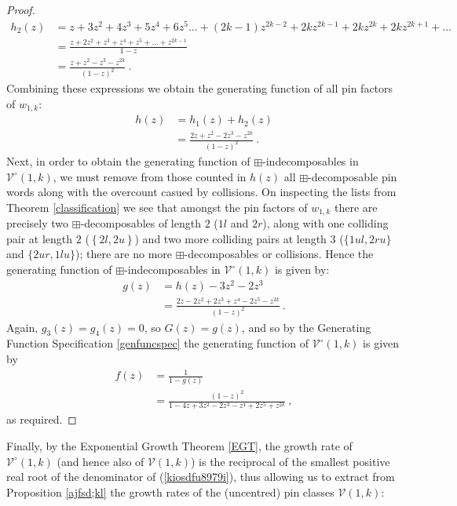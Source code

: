\documentclass[11pt,a4paper]{article}
\theoremstyle{definition}
\begin{document}
\begin{proof}
\[
\begin{split}
h_{2}(z) & = z + 3z^2 + 4z^3 + 5z^4 + 6z^5 \dots + (2k-1)z^{2k-2} + 2kz^{2k-1} + 2kz^{2k} + 2kz^{2k+1} + \dots\\
 & = \frac{z + 2z^2 + z^3 + z^4 + z^5 + \dots + z^{2k-1}}{1 - z} \\
 & = \frac{z + z^2 - z^3 - z^{2k}}{(1-z)^2} \ .
\end{split}
\]
Combining these expressions we obtain the generating function of all pin factors of $w_{1,k}$:
\[
\begin{split}
h(z) & = h_{1}(z) + h_{2}(z) \\
 & = \frac{2z + z^2 - 2z^3 - z^{2k}}{(1-z)^2} \ .
\end{split}
\]
Next, in order to obtain the generating function of $\boxplus$-indecomposables in $\mathcal{V}^{\circ}(1,k)$, we must remove from those counted in $h(z)$ all $\boxplus$-decomposable pin words along with the overcount casued by collisions. On inspecting the lists from Theorem \ref{classification} we see that amongst the pin factors of $w_{1,k}$ there are precisely two $\boxplus$-decomposables of length $2$ ($1l$ and $2r$), along with one colliding pair at length $2$ ($\left\{2l,2u\right\}$) and two more colliding pairs at length $3$ ($\{1ul,2ru\}$ and $\{2ur,1lu\}$); there are no more $\boxplus$-decomposables or collisions. Hence the generating function of $\boxplus$-indecomposables in $\mathcal{V}^{\circ}(1,k)$ is given by:
\[
\begin{split}
g(z) & = h(z) - 3z^2 - 2z^3 \\
 & = \frac{2z - 2z^2 + 2z^3 + z^4 - 2z^5 - z^{2k}}{(1-z)^2} \ .
\end{split}
\]
Again, $g_{3}(z)=g_{4}(z)=0$, so $G(z) = g(z)$, and so by the Generating Function Specification \ref{genfuncspec} the generating function of $\mathcal{V}^{\circ}(1,k)$ is given by
\[
\begin{split}
f(z) & = \frac{1}{1 - g(z)} \\
 & = \frac{(1-z)^2}{1 - 4z + 3z^2 - 2z^3 - z^4 + 2z^5 + z^{2k}} \ ,
\end{split}
\]
as required. \qedhere
\end{proof}

Finally, by the Exponential Growth Theorem \ref{EGT}, the growth rate of $\mathcal{V}^{\circ}(1,k)$ (and hence also of $\mathcal{V}(1,k)$) is the reciprocal of the smallest positive real root of the denominator of (\ref{kiosdfu8979i}), thus allowing us to extract from Proposition \ref{ajfsd;kl} the growth rates of the (uncentred) pin classes $\mathcal{V}(1,k)$:
\end{document}
